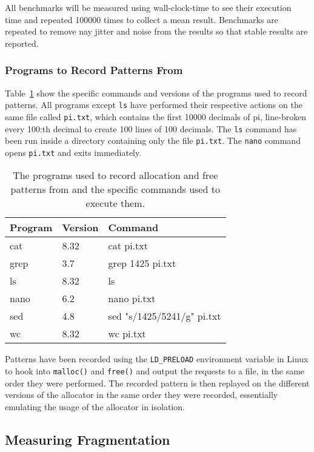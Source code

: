 All benchmarks will be measured using wall-clock-time to see their execution time and repeated 100000 times to collect a mean result. Benchmarks are repeated to remove nay jitter and noise from the results so that stable results are reported.

\subsubsection{Programs to Record Patterns From}

Table~\ref{table:pattern-programs} show the specific commands and versions of the programs used to record patterns. All programs except \texttt{ls} have performed their respective actions on the same file called \texttt{pi.txt}, which contains the first 10000 decimals of pi, line-broken every 100:th decimal to create 100 lines of 100 decimals. The \texttt{ls} command has been run inside a directory containing only the file \texttt{pi.txt}. The \texttt{nano} command opens \texttt{pi.txt} and exits immediately.

\begin{table}[H]
\centering
\begin{tabular}{llp{10.4cm}}
\textbf{Program} & \textbf{Version} & \textbf{Command} \\ \hline
cat  & 8.32 & cat pi.txt\\ \hline
grep & 3.7  & grep 1425 pi.txt\\ \hline
ls   & 8.32 & ls \\ \hline
nano & 6.2  & nano pi.txt\\ \hline
sed  & 4.8  & sed "s/1425/5241/g" pi.txt\\ \hline
wc   & 8.32 & wc pi.txt\\
\end{tabular}
\caption{The programs used to record allocation and free patterns from and the specific commands used to execute them.}
\label{table:pattern-programs}
\end{table}

Patterns have been recorded using the \texttt{LD\_PRELOAD} environment variable in Linux to hook into \texttt{malloc()} and \texttt{free()} and output the requests to a file, in the same order they were performed. The recorded pattern is then replayed on the different versions of the allocator in the same order they were recorded, essentially emulating the usage of the allocator in isolation.

\subsection{Measuring Fragmentation}

